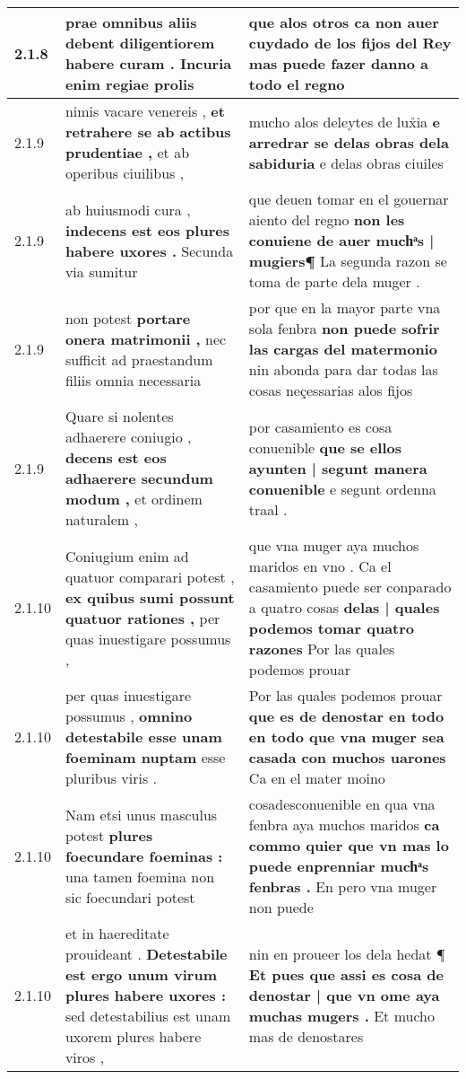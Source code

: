 \begin{tabular}{|p{1cm}|p{6.5cm}|p{6.5cm}|}
2.1.8 & prae omnibus aliis \textbf{ debent diligentiorem habere curam . } Incuria enim regiae prolis & que alos otros \textbf{ ca non auer cuydado de los fijos del Rey } mas puede fazer danno a todo el regno \\\hline
2.1.9 & nimis vacare venereis , \textbf{ et retrahere se ab actibus prudentiae , } et ab operibus ciuilibus , & mucho alos deleytes de lux̉ia \textbf{ e arredrar se delas obras dela sabiduria } e delas obras ciuiles \\\hline
2.1.9 & ab huiusmodi cura , \textbf{ indecens est eos plures habere uxores . } Secunda via sumitur & que deuen tomar en el gouernar aiento del regno \textbf{ non les conuiene de auer muchͣs | mugiers¶ } La segunda razon se toma de parte dela muger . \\\hline
2.1.9 & non potest \textbf{ portare onera matrimonii , } nec sufficit ad praestandum filiis omnia necessaria & por que en la mayor parte vna sola fenbra \textbf{ non puede sofrir las cargas del matermonio } nin abonda para dar todas las cosas neçessarias alos fijos \\\hline
2.1.9 & Quare si nolentes adhaerere coniugio , \textbf{ decens est eos adhaerere secundum modum , } et ordinem naturalem , & por casamiento es cosa conuenible \textbf{ que se ellos ayunten | segunt manera conuenible } e segunt ordenna traal . \\\hline
2.1.10 & Coniugium enim ad quatuor comparari potest , \textbf{ ex quibus sumi possunt quatuor rationes , } per quas inuestigare possumus , & que vna muger aya muchos maridos en vno . Ca el casamiento puede ser conparado a quatro cosas \textbf{ delas | quales podemos tomar quatro razones } Por las quales podemos prouar \\\hline
2.1.10 & per quas inuestigare possumus , \textbf{ omnino detestabile esse unam foeminam nuptam } esse pluribus viris . & Por las quales podemos prouar \textbf{ que es de denostar en todo en todo que vna muger sea casada con muchos uarones } Ca en el mater moino \\\hline
2.1.10 & Nam etsi unus masculus potest \textbf{ plures foecundare foeminas : } una tamen foemina non sic foecundari potest & cosadesconuenible en qua vna fenbra aya muchos maridos \textbf{ ca commo quier que vn mas lo puede enprenniar muchͣs fenbras . } En pero vna muger non puede \\\hline
2.1.10 & et in haereditate prouideant . \textbf{ Detestabile est ergo unum virum plures habere uxores : } sed detestabilius est unam uxorem plures habere viros , & nin en proueer los dela hedat ¶ \textbf{ Et pues que assi es cosa de denostar | que vn ome aya muchas mugers . } Et mucho mas de denostares \\\hline

\end{tabular}
